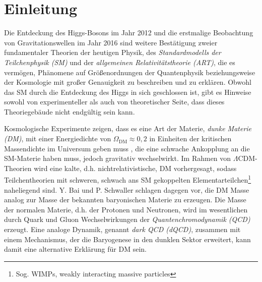 \clearpage
\section{Einleitung}
  Die Entdeckung des Higgs-Bosons im Jahr 2012 \cite{Higgs} und die erstmalige 
  Beobachtung von Gravitationswellen im Jahr 2016 \cite{gravitational_waves} 
  sind weitere Bestätigung zweier fundamentaler Theorien der heutigen 
  Physik, des \textit{Standardmodells der Teilchenphysik (SM)} und der 
  \textit{allgemeinen Relativitätstheorie (ART)}, die es vermögen, Phänomene 
  auf Größenordnungen der Quantenphysik beziehungsweise der Kosmologie mit 
  großer Genauigkeit zu beschreiben und zu erklären. Obwohl das SM durch die 
  Entdeckung des Higgs in sich geschlossen ist, gibt es Hinweise sowohl von 
  experimenteller als auch von theoretischer Seite, dass dieses Theoriegebäude 
  nicht endgültig sein kann. 
  
  Kosmologische Experimente zeigen, dass es eine Art der Materie, 
  \textit{dunke Materie (DM)}, mit einer Energiedichte von 
  $\Omega_\text{DM}\approx 0,2$ in Einheiten der kritischen Massendichte 
  im Universum geben muss \cite{PDG:DM}, die eine schwache Ankopplung an die 
  SM-Materie haben muss, jedoch gravitativ wechselwirkt. Im Rahmen von 
  $\Lambda$CDM-Theorien wird eine kalte, d.h. nichtrelativistische, DM 
  vorhergesagt, sodass Teilchentheorien mit schweren, schwach ans SM 
  gekoppelten Elementarteilchen\footnote{Sog. WIMPs, weakly interacting massive 
  particles} naheliegend sind. Y. Bai und P. Schwaller schlagen dagegen vor, 
  die DM Masse analog zur Masse der bekannten baryonischen Materie zu erzeugen.  
  Die Masse der normalen Materie, d.h. der Protonen und Neutronen, wird im 
  wesentlichen durch Quark und Gluon Wechselwirkungen der 
  \textit{Quantenchromodynamik (QCD)} erzeugt. Eine analoge Dynamik, genannt 
  \textit{dark QCD (dQCD)}, zusammen mit einem Mechanismus, der die 
  Baryogenese in den dunklen Sektor erweitert, kann damit eine alternative 
  Erklärung für DM sein. \cite{Scale_of_dark_QCD}
  
